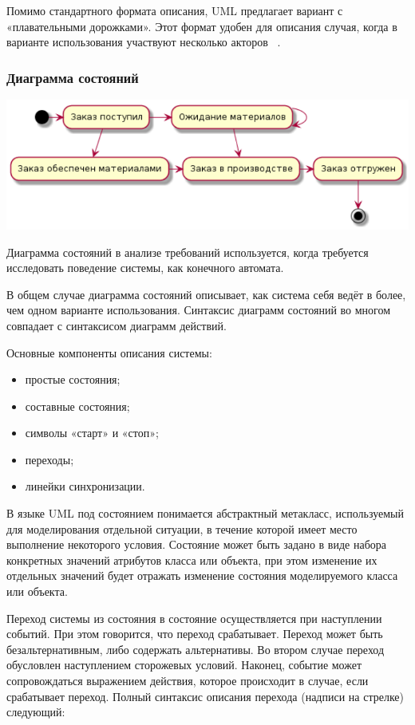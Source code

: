 \documentclass{../industrial-development}
\begin{document}
Помимо стандартного формата описания, UML предлагает вариант с «плавательными дорожками». Этот формат удобен для описания случая, когда в варианте использования участвуют несколько акторов
~\cite[с.~47--48]{Maglinec}.


\begin{frame} \frametitle {Диаграмма состояний}
 \centerline{\includegraphics[width=1.1\textwidth]{pictstatechartd.pdf}}
\end{frame}

\lecturenotes

\alert{Диаграмма состояний} в анализе требований используется, когда требуется исследовать поведение системы, как конечного автомата. 

В общем случае диаграмма состояний описывает, как система себя ведёт в более, чем одном варианте использования. Синтаксис диаграмм состояний во многом совпадает с синтаксисом диаграмм действий.

Основные компоненты описания системы:
\begin{itemize}
\item простые состояния;
\item составные состояния;
\item символы «старт» и «стоп»;
\item переходы;
\item линейки синхронизации.
\end{itemize}

В языке UML под состоянием понимается абстрактный метакласс, используемый для моделирования отдельной ситуации, в течение которой имеет место выполнение некоторого условия. Состояние может быть задано в виде набора конкретных значений атрибутов класса или объекта, при этом изменение их отдельных значений будет отражать изменение состояния моделируемого класса или объекта.

Переход системы из состояния в состояние осуществляется при наступлении событий. При этом говорится, что переход срабатывает. Переход может быть безальтернативным, либо содержать альтернативы. Во втором случае переход обусловлен наступлением сторожевых условий. Наконец, событие может сопровождаться выражением действия, которое происходит в случае, если срабатывает переход. Полный синтаксис описания перехода (надписи на стрелке) следующий:
\end{document}
